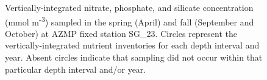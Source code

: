 \documentclass[12pt]{article}\usepackage[]{graphicx}\usepackage[]{color}
\begin{document}
\begin{figure}[htb]

{\centering {} 

}

\caption{Vertically-integrated nitrate, phosphate, and silicate concentration (mmol m\textsuperscript{-3}) sampled in the spring (April) and fall (September and October) at AZMP fixed station SG\_23. Circles represent the vertically-integrated nutrient inventories for each depth interval and year. Absent circles indicate that sampling did not occur within that particular depth interval and/or year.}\label{fig:figure21}
\end{figure}
\clearpage
\end{document}
